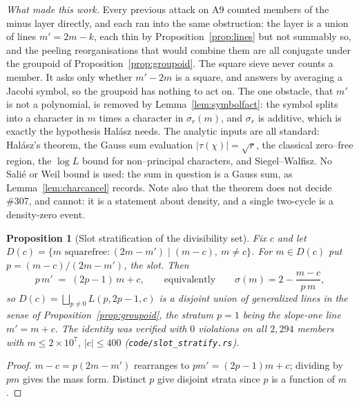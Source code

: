 \documentclass[11pt]{article}
\newtheorem{proposition}[theorem]{Proposition}
\theoremstyle{definition}
\begin{document}
\emph{What made this work.} Every previous attack on $\mathrm{A}9$ counted members of the minus layer directly, and each ran
into the same obstruction: the layer is a union of lines $m'=2m-k$, each thin by
Proposition~\ref{prop:lines} but not summably so, and the peeling reorganisations that would combine
them are all conjugate under the groupoid of Proposition~\ref{prop:groupoid}. The square sieve never
counts a member. It asks only whether $m'-2m$ is a square, and answers by averaging a Jacobi symbol,
so the groupoid has nothing to act on. The one obstacle, that $m'$ is not a polynomial, is removed by
Lemma~\ref{lem:symbolfact}: the symbol splits into a character in $m$ times a character in
$\sigma_r(m)$, and $\sigma_r$ is additive, which is exactly the hypothesis Hal\'asz needs. The
analytic inputs are all standard: Hal\'asz's theorem, the Gauss sum evaluation
$|\tau(\chi)|=\sqrt r$, the classical zero--free region, the $\log L$ bound for non--principal
characters, and Siegel--Walfisz. No Sali\'e or Weil bound is used: the sum in question is a Gauss
sum, as Lemma~\ref{lem:charcancel} records. Note also that the theorem does not decide \#307, and cannot: it is a statement about
density, and a single two-cycle is a density-zero event.


\begin{proposition}[Slot stratification of the divisibility set]\label{prop:slotstrat}
Fix $c$ and let $D(c)=\{m \text{ squarefree}: (2m-m')\mid(m-c),\ m\neq c\}$. For $m\in D(c)$ put
$p=(m-c)/(2m-m')$, the \emph{slot}. Then
\[ p\,m' \;=\; (2p-1)\,m + c, \qquad\text{equivalently}\qquad \sigma(m)=2-\frac{m-c}{p\,m}, \]
so $D(c)=\bigsqcup_{p\neq0} L(p,2p-1,c)$ is a disjoint union of generalized lines in the sense of
Proposition~\textup{\ref{prop:groupoid}}, the stratum $p=1$ being the slope-\emph{one} line
$m'=m+c$. The identity was verified with $0$ violations on all $2{,}294$ members with
$m\le2\times10^7$, $|c|\le400$ \textup{(\texttt{code/slot\_stratify.rs})}.
\end{proposition}
\begin{proof}
$m-c=p(2m-m')$ rearranges to $pm'=(2p-1)m+c$; dividing by $pm$ gives the mass form. Distinct $p$
give disjoint strata since $p$ is a function of $m$.
\end{proof}
\end{document}

